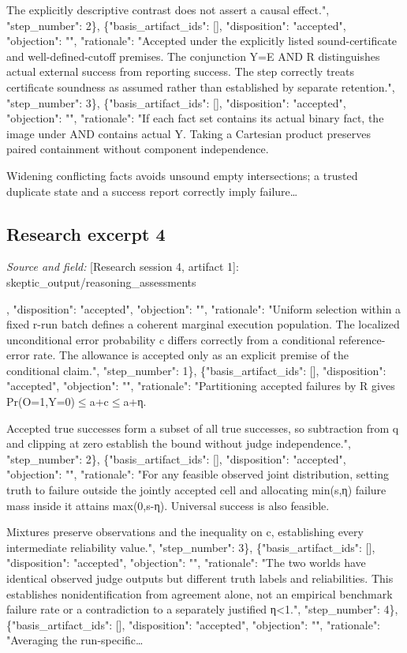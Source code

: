 \documentclass[11pt]{article}
\begin{document}
The explicitly descriptive contrast does not assert a causal effect.", "step\_number": 2\}, \{"basis\_artifact\_ids": [], "disposition": "accepted", "objection": "", "rationale": "Accepted under the explicitly listed sound-certificate and well-defined-cutoff premises. The conjunction Y=E AND R distinguishes actual external success from reporting success. The step correctly treats certificate soundness as assumed rather than established by separate retention.", "step\_number": 3\}, \{"basis\_artifact\_ids": [], "disposition": "accepted", "objection": "", "rationale": "If each fact set contains its actual binary fact, the image under AND contains actual Y. Taking a Cartesian product preserves paired containment without component independence.

Widening conflicting facts avoids unsound empty intersections; a trusted duplicate state and a success report correctly imply failure\ldots{}

\subsection{Research excerpt 4}
\textit{Source and field: }[Research session 4, artifact 1]: skeptic\_output/reasoning\_assessments\par
[\{"basis\_artifact\_ids": [], "disposition": "accepted", "objection": "", "rationale": "Uniform selection within a fixed r-run batch defines a coherent marginal execution population. The localized unconditional error probability c differs correctly from a conditional reference-error rate. The allowance is accepted only as an explicit premise of the conditional claim.", "step\_number": 1\}, \{"basis\_artifact\_ids": [], "disposition": "accepted", "objection": "", "rationale": "Partitioning accepted failures by R gives Pr(O=1,Y=0)$\leq$a+c$\leq$a+η.

Accepted true successes form a subset of all true successes, so subtraction from q and clipping at zero establish the bound without judge independence.", "step\_number": 2\}, \{"basis\_artifact\_ids": [], "disposition": "accepted", "objection": "", "rationale": "For any feasible observed joint distribution, setting truth to failure outside the jointly accepted cell and allocating min(s,η) failure mass inside it attains max(0,s-η). Universal success is also feasible.

Mixtures preserve observations and the inequality on c, establishing every intermediate reliability value.", "step\_number": 3\}, \{"basis\_artifact\_ids": [], "disposition": "accepted", "objection": "", "rationale": "The two worlds have identical observed judge outputs but different truth labels and reliabilities. This establishes nonidentification from agreement alone, not an empirical benchmark failure rate or a contradiction to a separately justified η\textless{}1.", "step\_number": 4\}, \{"basis\_artifact\_ids": [], "disposition": "accepted", "objection": "", "rationale": "Averaging the run-specific\ldots{}
\end{document}
